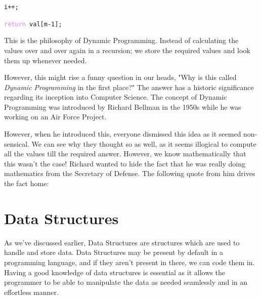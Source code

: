 \documentclass{article}
\theoremstyle{definition}
\theoremstyle{example}
\begin{document}
\noindent \hspace{30mm} \texttt{i++;}\par
\noindent \hspace{10mm} \texttt{\textcolor{violet}{return} val[m-1];} \par
\vspace{5mm}
This is the philosophy of Dynamic Programming. Instead of calculating the values over and over again in a recursion; we store the required values and look them up whenever needed.\par
\vspace{4mm}
However, this might rise a funny question in our heads, "Why is this called \textit{Dynamic Programming} in the first place?" The answer has a historic significance regarding its inception into Computer Science. The concept of Dynamic Programming was introduced by Richard Bellman in the 1950s while he was working on an Air Force Project.\par
\vspace{4mm}
However, when he introduced this, everyone dismissed this idea as it seemed non-sensical. We can see why they thought so as well, as it seems illogical to compute all the values till the required answer. However, we know mathematically that this wasn't the case! Richard wanted to hide the fact that he was really doing mathematics from the Secretary of Defense. The following quote from him drives the fact home:\par
\vspace{4mm}

\section{\Large Data Structures}
\hspace{4mm}As we've discussed earlier, Data Structures are structures which are used to handle and store data. Data Structures may be present by default in a programming language, and if they aren't present in there, we can code them in. Having a good knowledge of data structures is essential as it allows the programmer to be able to manipulate the data as needed seamlessly and in an effortless manner. \par
\end{document}
